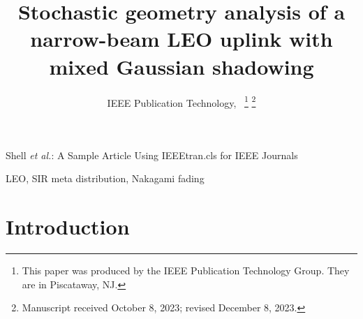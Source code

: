 \documentclass[lettersize,journal]{IEEEtran}
\begin{document}
\title{Stochastic geometry analysis of a narrow-beam LEO uplink with mixed Gaussian shadowing}
\author{IEEE Publication Technology,~
\thanks{This paper was produced by the IEEE Publication Technology Group. They are in Piscataway, NJ.}%
\thanks{Manuscript received October 8, 2023; revised December 8, 2023.}}

%
{Shell \MakeLowercase{\textit{et al.}}: A Sample Article Using IEEEtran.cls for IEEE Journals}

\IEEEpubid{}


\maketitle
\begin{abstract}
\end{abstract}

\begin{IEEEkeywords}
  LEO, SIR meta distribution, Nakagami fading
\end{IEEEkeywords}


\section{Introduction}
\end{document}
